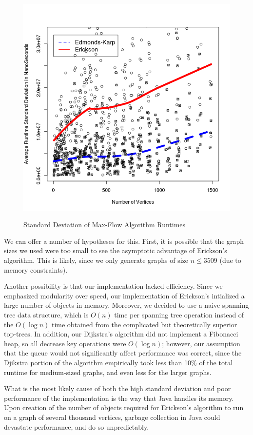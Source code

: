 \documentclass[12pt]{article}
\begin{document}
\begin{figure}[h!]
\caption{Standard Deviation of Max-Flow Algorithm Runtimes}
\centering
\includegraphics[width=5in]{maxflow_results_std.png}
\label{fig:maxflow_std}
\end{figure}

We can offer a number of hypotheses for this. First, it is possible that the graph sizes we used were too small to see the asymptotic advantage of Erickson's algorithm. This is likely, since we only generate graphs of size $n \leq 3509$ (due to memory constraints). 

Another possibility is that our implementation lacked efficiency. Since we emphasized modularity over speed, our implementation of Erickson's intialized a large number of objects in memory. Moreover, we decided to use a naive spanning tree data structure, which is $O(n)$ time per spanning tree operation instead of the $O(\log n)$ time obtained from the complicated but theoretically superior top-trees. In addition, our Dijkstra's algorithm did not implement a Fibonacci heap, so all decrease key operations were $O(\log n)$; however, our assumption that the queue would not significantly affect performance was correct, since the Djikstra portion of the algorithm empirically took less than 10\% of the total runtime for medium-sized graphs, and even less for the larger graphs.

What is the most likely cause of both the high standard deviation and poor performance of the implementation is the way that Java handles its memory.  Upon creation of the number of objects required for Erickson's algorithm to run on a graph of several thousand vertices, garbage collection in Java could devastate performance, and do so unpredictably.
\end{document}
